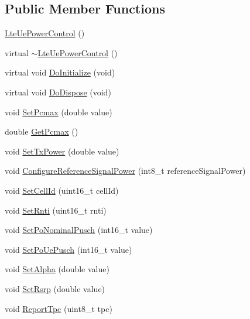 \subsection*{Public Member Functions}
\begin{DoxyCompactItemize}
\item 
\hyperlink{classns3_1_1LteUePowerControl_a98634f9063bfe469a1b025b6f6bbd02e}{Lte\+Ue\+Power\+Control} ()
\item 
virtual \hyperlink{classns3_1_1LteUePowerControl_aeed1491b605e764e8127988a3c3ea0a0}{$\sim$\+Lte\+Ue\+Power\+Control} ()
\item 
virtual void \hyperlink{classns3_1_1LteUePowerControl_ad7e27ee4a422d0f9547aafd82049ec40}{Do\+Initialize} (void)
\item 
virtual void \hyperlink{classns3_1_1LteUePowerControl_a740e796c05162c9efc6660185b53a2a5}{Do\+Dispose} (void)
\item 
void \hyperlink{classns3_1_1LteUePowerControl_a66d080d96649deeea8d0fe7cbfe62923}{Set\+Pcmax} (double value)
\item 
double \hyperlink{classns3_1_1LteUePowerControl_ab1d8e7b5b97faef673981f045cfd081c}{Get\+Pcmax} ()
\item 
void \hyperlink{classns3_1_1LteUePowerControl_aa4fb3c51cedc24bce524841581a150dc}{Set\+Tx\+Power} (double value)
\item 
void \hyperlink{classns3_1_1LteUePowerControl_a6ccd4a130fcff106dba6d65da4a53744}{Configure\+Reference\+Signal\+Power} (int8\+\_\+t reference\+Signal\+Power)
\item 
void \hyperlink{classns3_1_1LteUePowerControl_a32a9a5c657b6ab44174ca10c5684dbf2}{Set\+Cell\+Id} (uint16\+\_\+t cell\+Id)
\item 
void \hyperlink{classns3_1_1LteUePowerControl_a8660b46be65cb4fa66be63ea7f0a8a8f}{Set\+Rnti} (uint16\+\_\+t rnti)
\item 
void \hyperlink{classns3_1_1LteUePowerControl_a011b5a698f3275b2dfd9e5c6773267ad}{Set\+Po\+Nominal\+Pusch} (int16\+\_\+t value)
\item 
void \hyperlink{classns3_1_1LteUePowerControl_a4c3ac336e7204466c6cd8a950da2f3a2}{Set\+Po\+Ue\+Pusch} (int16\+\_\+t value)
\item 
void \hyperlink{classns3_1_1LteUePowerControl_adca4253fbb3f2047ee1859a5b4bf0ca0}{Set\+Alpha} (double value)
\item 
void \hyperlink{classns3_1_1LteUePowerControl_a6482febbed5a02ecd870c9061cf0e999}{Set\+Rsrp} (double value)
\item 
void \hyperlink{classns3_1_1LteUePowerControl_ad3ede15a24b707741290e6a94e5d82de}{Report\+Tpc} (uint8\+\_\+t tpc)

\end{DoxyCompactItemize}
